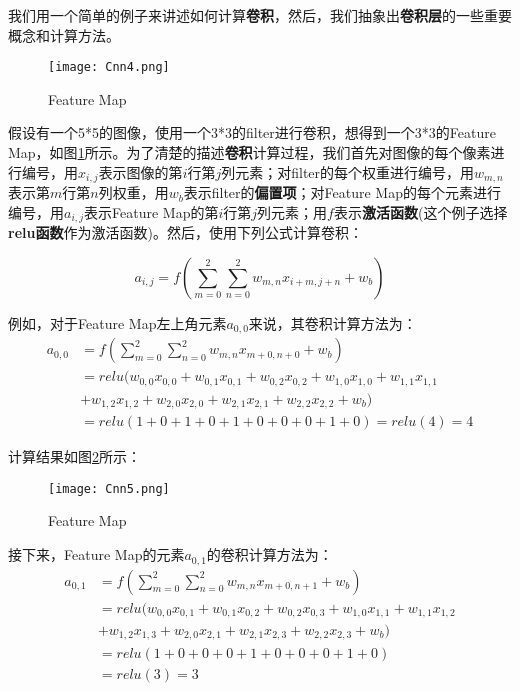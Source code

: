 我们用一个简单的例子来讲述如何计算\textbf{卷积}，然后，我们抽象出\textbf{卷积层}的一些重要概念和计算方法。

\begin{figure}[!h]
	\centering
	\texttt{[image: Cnn4.png]}
	\caption{Feature Map}
	\label{fig:Cnn4}
\end{figure}

假设有一个5*5的图像，使用一个3*3的filter进行卷积，想得到一个3*3的Feature Map，如图\ref{fig:Cnn4}所示。为了清楚的描述\textbf{卷积}计算过程，我们首先对图像的每个像素进行编号，用\(x_{i,j}\)表示图像的第\(i\)行第\(j\)列元素；对filter的每个权重进行编号，用\(w_{m,n}\)表示第\(m\)行第\(n\)列权重，用\(w_b\)表示filter的\textbf{偏置项}；对Feature Map的每个元素进行编号，用\(a_{i,j}\)表示Feature Map的第\(i\)行第\(j\)列元素；用\(f\)表示\textbf{激活函数}(这个例子选择\textbf{relu函数}作为激活函数)。然后，使用下列公式计算卷积：

\begin{equation}
	\label{eq:Cnn1}
	a_{i,j}=f(\sum_{m=0}^{2}\sum_{n=0}^{2}w_{m,n}x_{i+m,j+n}+w_b)
\end{equation}


例如，对于Feature Map左上角元素\(a_{0,0}\)来说，其卷积计算方法为：
\begin{align*}
	a_{0,0} & =f(\sum_{m=0}^{2}\sum_{n=0}^{2}w_{m,n}x_{m+0,n+0}+w_b)                           \\
	        & =relu(w_{0,0}x_{0,0}+w_{0,1}x_{0,1}+w_{0,2}x_{0,2}+w_{1,0}x_{1,0}+w_{1,1}x_{1,1} \\
	        & +w_{1,2}x_{1,2}+w_{2,0}x_{2,0}+w_{2,1}x_{2,1}+w_{2,2}x_{2,2}+w_b)                \\
	        & =relu(1+0+1+0+1+0+0+0+1+0)=relu(4)=4
\end{align*}

计算结果如图\ref{fig:Cnn5}所示：

\begin{figure}[!h]
	\centering
	\texttt{[image: Cnn5.png]}
	\caption{Feature Map}
	\label{fig:Cnn5}
\end{figure}

接下来，Feature Map的元素\(a_{0,1}\)的卷积计算方法为：
\begin{align*}
	a_{0,1} & =f(\sum_{m=0}^{2}\sum_{n=0}^{2}w_{m,n}x_{m+0,n+1}+w_b)                           \\
	        & =relu(w_{0,0}x_{0,1}+w_{0,1}x_{0,2}+w_{0,2}x_{0,3}+w_{1,0}x_{1,1}+w_{1,1}x_{1,2} \\
	        & +w_{1,2}x_{1,3}+w_{2,0}x_{2,1}+w_{2,1}x_{2,3}+w_{2,2}x_{2,3}+w_b)                \\
	        & =relu(1+0+0+0+1+0+0+0+1+0)                                                       \\
	        & =relu(3)=3
\end{align*}


